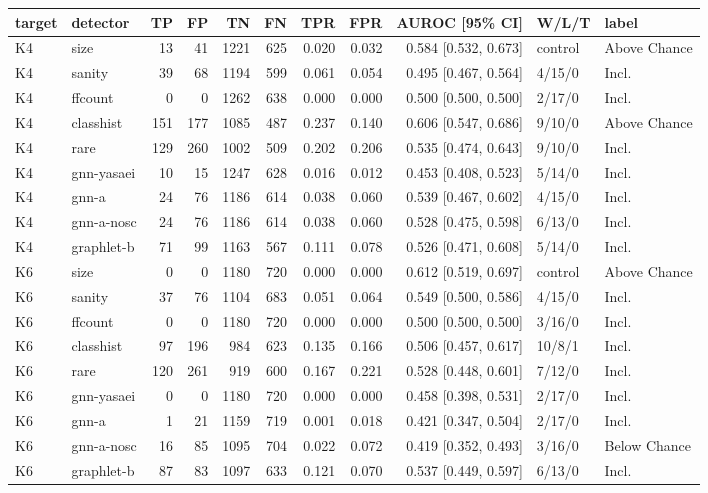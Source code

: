 \begin{tabular}{@{}llrrrrrrrll@{}}
\toprule
target & detector & TP & FP & TN & FN & TPR & FPR & AUROC [95\% CI] & W/L/T & label \\
\midrule
K4 & size & 13 & 41 & 1221 & 625 & 0.020 & 0.032 & 0.584 [0.532, 0.673] & control & Above Chance \\
K4 & sanity & 39 & 68 & 1194 & 599 & 0.061 & 0.054 & 0.495 [0.467, 0.564] & 4/15/0 & Incl. \\
K4 & ffcount & 0 & 0 & 1262 & 638 & 0.000 & 0.000 & 0.500 [0.500, 0.500] & 2/17/0 & Incl. \\
K4 & classhist & 151 & 177 & 1085 & 487 & 0.237 & 0.140 & 0.606 [0.547, 0.686] & 9/10/0 & Above Chance \\
K4 & rare & 129 & 260 & 1002 & 509 & 0.202 & 0.206 & 0.535 [0.474, 0.643] & 9/10/0 & Incl. \\
K4 & gnn-yasaei & 10 & 15 & 1247 & 628 & 0.016 & 0.012 & 0.453 [0.408, 0.523] & 5/14/0 & Incl. \\
K4 & gnn-a & 24 & 76 & 1186 & 614 & 0.038 & 0.060 & 0.539 [0.467, 0.602] & 4/15/0 & Incl. \\
K4 & gnn-a-nosc & 24 & 76 & 1186 & 614 & 0.038 & 0.060 & 0.528 [0.475, 0.598] & 6/13/0 & Incl. \\
K4 & graphlet-b & 71 & 99 & 1163 & 567 & 0.111 & 0.078 & 0.526 [0.471, 0.608] & 5/14/0 & Incl. \\
\midrule
K6 & size & 0 & 0 & 1180 & 720 & 0.000 & 0.000 & 0.612 [0.519, 0.697] & control & Above Chance \\
K6 & sanity & 37 & 76 & 1104 & 683 & 0.051 & 0.064 & 0.549 [0.500, 0.586] & 4/15/0 & Incl. \\
K6 & ffcount & 0 & 0 & 1180 & 720 & 0.000 & 0.000 & 0.500 [0.500, 0.500] & 3/16/0 & Incl. \\
K6 & classhist & 97 & 196 & 984 & 623 & 0.135 & 0.166 & 0.506 [0.457, 0.617] & 10/8/1 & Incl. \\
K6 & rare & 120 & 261 & 919 & 600 & 0.167 & 0.221 & 0.528 [0.448, 0.601] & 7/12/0 & Incl. \\
K6 & gnn-yasaei & 0 & 0 & 1180 & 720 & 0.000 & 0.000 & 0.458 [0.398, 0.531] & 2/17/0 & Incl. \\
K6 & gnn-a & 1 & 21 & 1159 & 719 & 0.001 & 0.018 & 0.421 [0.347, 0.504] & 2/17/0 & Incl. \\
K6 & gnn-a-nosc & 16 & 85 & 1095 & 704 & 0.022 & 0.072 & 0.419 [0.352, 0.493] & 3/16/0 & Below Chance \\
K6 & graphlet-b & 87 & 83 & 1097 & 633 & 0.121 & 0.070 & 0.537 [0.449, 0.597] & 6/13/0 & Incl. \\

\end{tabular}

